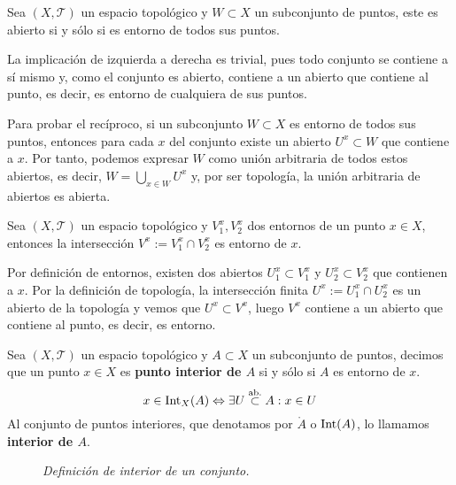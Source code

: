 \begin{prop}
Sea $(X, \mathcal{T})$ un espacio topológico y $W \subset X$ un subconjunto de puntos, este es abierto si y sólo si es entorno de todos sus puntos.
\end{prop}
\begin{demo}
La implicación de izquierda a derecha es trivial, pues todo conjunto se contiene a sí mismo y, como el conjunto es abierto, contiene a un abierto que contiene al punto, es decir, es entorno de cualquiera de sus puntos.

Para probar el recíproco, si un subconjunto $W\subset X$ es entorno de todos sus puntos, entonces para cada $x$ del conjunto existe un abierto $U^x\subset W$ que contiene a $x$. Por tanto, podemos expresar $W$ como unión arbitraria de todos estos abiertos, es decir, $W = \bigcup_{x\in W} U^x$ y, por ser topología, la unión arbitraria de abiertos es abierta.
\end{demo}

\begin{prop}
Sea $(X,\mathcal{T})$ un espacio topológico y $V_1^x, V_2^x$ dos entornos de un punto $x\in X$, entonces la intersección $V^x := V_1^x\cap V_2^x$ es entorno de $x$.
\end{prop}
\begin{demo}
Por definición de entornos, existen dos abiertos $U_1^x\subset V_1^x$ y $U_2^x\subset V_2^x$ que contienen a $x$. Por la definición de topología, la intersección finita $U^x := U_1^x\cap U_2^x$ es un abierto de la topología y vemos que $U^x \subset V^x$, luego $V^x$ contiene a un abierto que contiene al punto, es decir, es entorno.
\end{demo}

\begin{defi}
Sea $(X,\mathcal{T})$ un espacio topológico y $A \subset X$ un subconjunto de puntos, decimos que un punto $x\in X$ es \textbf{punto interior de $A$} si y sólo si $A$ es entorno de $x$.
$$
x\in \operatorname{Int}_X(A) \Leftrightarrow \exists U \stackrel{\text{ab.}}{\subset} A : x \in U
$$
Al conjunto de puntos interiores, que denotamos por $\mathring{A}$ o $\operatorname{Int}(A)$, lo llamamos \textbf{interior de $A$}.
\end{defi}

\begin{figure}[H]
    \centering
    \caption{\textit{Definición de interior de un conjunto.}}
    \label{fig:definición-interior}
\end{figure}

